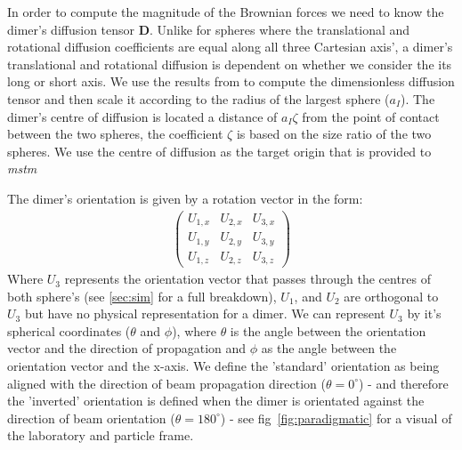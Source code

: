 In order to compute the magnitude of the Brownian forces we
need to know the dimer's diffusion tensor \textbf{D}. Unlike
for spheres where the translational and rotational diffusion 
coefficients are equal along all three Cartesian axis', a
dimer's translational and rotational diffusion is dependent
on whether we consider the its long or short axis. We use
the results from \cite{Nir1973} to compute the dimensionless 
diffusion tensor and then scale it according to the radius of
the largest sphere ($a_I$). The dimer's centre of diffusion
is located a distance of $a_I\zeta$ from the point of contact
between the two spheres, the coefficient $\zeta$ is based on
the size ratio of the two spheres. We use the centre of 
diffusion as the target origin that is provided to \textit{mstm}

The dimer's orientation is given by a rotation vector in 
the form: 
\begin{align}
	\begin{pmatrix}
		U_{1,x} & U_{2,x} & U_{3,x} \\
		U_{1,y} & U_{2,y} & U_{3,y} \\
		U_{1,z} & U_{2,z} & U_{3,z}
	\end{pmatrix}
\end{align}
Where $U_3$ represents the orientation vector that passes
through the centres of both sphere's (see \ref{sec:sim} 
for a full breakdown), $U_1$, and $U_2$ are orthogonal to 
$U_3$ but have no physical representation for a dimer. We 
can represent $U_3$ by it's spherical coordinates ($\theta$ 
and $\phi$), where $\theta$ is the angle between the 
orientation vector and the direction of propagation and 
$\phi$ as the angle between the orientation vector and 
the x-axis. We define the 'standard' orientation as 
being aligned with the direction of beam propagation 
direction ($\theta=0^\circ$) - and therefore the 'inverted' 
orientation is defined when the dimer is orientated against 
the direction of beam orientation ($\theta=180^\circ$) - see
fig~\ref{fig:paradigmatic} for a visual of the laboratory and
particle frame. 

